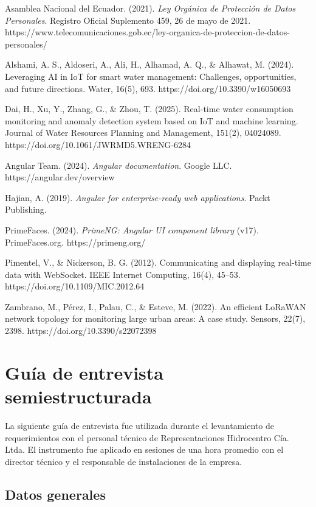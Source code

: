\documentclass[12pt,a4paper,oneside]{report}
\begin{document}
Asamblea Nacional del Ecuador. (2021). \textit{Ley Orgánica de Protección de Datos Personales}. Registro Oficial Suplemento 459, 26 de mayo de 2021. https://www.telecomunicaciones.gob.ec/ley-organica-de-proteccion-de-datos-personales/

Alshami, A. S., Aldoseri, A., Ali, H., Alhamad, A. Q., \& Alhawat, M. (2024). Leveraging AI in IoT for smart water management: Challenges, opportunities, and future directions. Water, 16(5), 693. https://doi.org/10.3390/w16050693

Dai, H., Xu, Y., Zhang, G., \& Zhou, T. (2025). Real-time water consumption monitoring and anomaly detection system based on IoT and machine learning. Journal of Water Resources Planning and Management, 151(2), 04024089. https://doi.org/10.1061/JWRMD5.WRENG-6284

Angular Team. (2024). \textit{Angular documentation}. Google LLC. https://angular.dev/overview

Hajian, A. (2019). \textit{Angular for enterprise-ready web applications}. Packt Publishing.

PrimeFaces. (2024). \textit{PrimeNG: Angular UI component library} (v17). PrimeFaces.org. https://primeng.org/

Pimentel, V., \& Nickerson, B. G. (2012). Communicating and displaying real-time data with WebSocket. IEEE Internet Computing, 16(4), 45--53. https://doi.org/10.1109/MIC.2012.64

Zambrano, M., Pérez, I., Palau, C., \& Esteve, M. (2022). An efficient LoRaWAN network topology for monitoring large urban areas: A case study. Sensors, 22(7), 2398. https://doi.org/10.3390/s22072398

\appendix

\chapter{Guía de entrevista semiestructurada}
\label{apendice:entrevista}

La siguiente guía de entrevista fue utilizada durante el levantamiento de requerimientos con el personal técnico de Representaciones Hidrocentro Cía. Ltda. El instrumento fue aplicado en sesiones de una hora promedio con el director técnico y el responsable de instalaciones de la empresa.

\section*{Datos generales}
\end{document}
